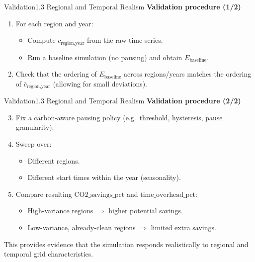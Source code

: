 \begin{frame}{Validation}{1.3 Regional and Temporal Realism}
  \textbf{Validation procedure (1/2)}
  \begin{enumerate}
    \item For each region and year:
      \begin{itemize}
        \item Compute $\bar{c}_{\text{region,year}}$ from the raw time series.
        \item Run a baseline simulation (no pausing) and obtain
          $E_{\text{baseline}}$.
      \end{itemize}
    \item Check that the ordering of $E_{\text{baseline}}$ across regions/years
      matches the ordering of $\bar{c}_{\text{region,year}}$
      (allowing for small deviations).
  \end{enumerate}
\end{frame}

\begin{frame}{Validation}{1.3 Regional and Temporal Realism}
  \textbf{Validation procedure (2/2)}
  \begin{enumerate}
      \setcounter{enumi}{2}
    \item Fix a carbon-aware pausing policy
      (e.g.\ threshold, hysteresis, pause granularity).
    \item Sweep over:
      \begin{itemize}
        \item Different regions.
        \item Different start times within the year (seasonality).
      \end{itemize}
    \item Compare resulting
      $\text{CO2\_savings\_pct}$ and $\text{time\_overhead\_pct}$:
      \begin{itemize}
        \item High-variance regions $\Rightarrow$ higher potential savings.
        \item Low-variance, already-clean regions $\Rightarrow$
          limited extra savings.
      \end{itemize}
  \end{enumerate}

  \vspace{0.2cm}
  This provides evidence that the simulation responds realistically
  to regional and
  temporal grid characteristics.
\end{frame}
